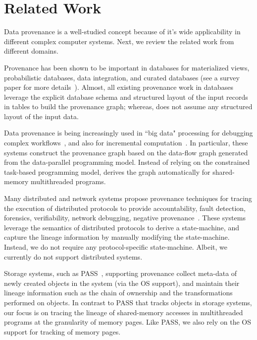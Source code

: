 \section{Related Work}
\label{sec:related}





Data provenance is a well-studied concept because of it's wide applicability in different complex computer systems. Next, we review the related work from different domains.






 Provenance has been shown to be important in databases for materialized views, probabilistic databases, data integration, and curated databases (see a survey paper for more details~\cite{provenance-database-tutorial}). Almost, all existing provenance work in databases leverage the explicit database schema and structured layout of the input records in tables to build the provenance graph; whereas, \projecttitle does not assume any structured layout of the input data.


 
 Data provenance is being increasingly used in ``big data"  processing for  debugging complex workflows~\cite{nova, conductor-podc-2010, conductor-ladis-2010, conductor-nsdi-2012}, and also for incremental computation~\cite{ Bhatotia15, slider, contraction-tree, shredder, incoop-hotcloud, incoop,   incApprox}.  In particular, these systems construct the provenance graph based on the data-flow graph generated from the data-parallel programming model. 
Instead of relying on the constrained task-based programming model,  \projecttitle derives the graph automatically for shared-memory multithreaded programs.


 Many distributed and network systems propose provenance techniques for tracing the  execution of distributed protocols to provide accountability, fault detection, forensics, verifiability, network debugging, negative provenance~\cite{ wu-2014-negative-provenance, snp, dtap}. 
These systems leverage the semantics of distributed protocols to derive a state-machine, and capture the lineage information by manually modifying the state-machine. Instead, we do not require any protocol-specific state-machine. Albeit, we currently do not support distributed systems.




 Storage systems, such as PASS~\cite{pass-atc}, supporting provenance collect meta-data of newly created objects in the system (via the OS support), 
and  maintain their lineage information such as the chain of ownership and the transformations performed on objects. In contrast to PASS that tracks objects in storage systems,  our focus is on tracing the lineage of shared-memory accesses in multithreaded programs at the granularity of memory pages. Like PASS, we also rely on the OS support for tracking of memory pages.


